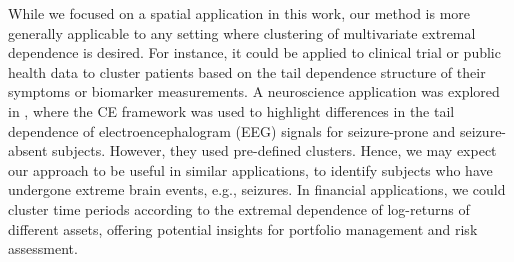 \documentclass[12pt,compact]{article}
\begin{document}
While we focused on a spatial application in this work, our method is more generally applicable to any setting where clustering of multivariate extremal dependence is desired.
For instance, it could be applied to clinical trial or public health data to cluster patients based on the tail dependence structure of their symptoms or biomarker measurements.
A neuroscience application was explored in \citet{Talento2025}, where the CE framework was used to highlight differences in the tail dependence of electroencephalogram (EEG) signals for seizure-prone and seizure-absent subjects. 
However, they used pre-defined clusters. Hence, we may expect our approach to be useful in similar applications, to identify subjects who have undergone extreme brain events, e.g., seizures.
In financial applications, we could cluster time periods according to the extremal dependence of log-returns of different assets, offering potential insights for portfolio management and risk assessment.
\end{document}
